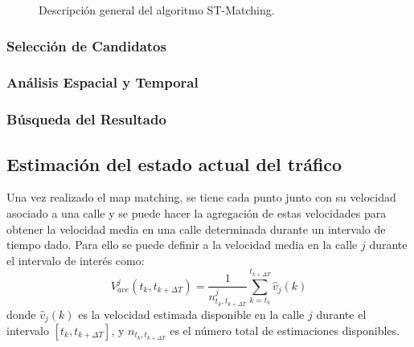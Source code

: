 \begin{figure}[h]
	\centering
	
	\caption[Descripción General de ST-Matching]{Descripción general del algoritmo ST-Matching.}
	\label{fig:st-matching} 
\end{figure}

\subsubsection{Selección de Candidatos}

\subsubsection{Análisis Espacial y Temporal}

\subsubsection{Búsqueda del Resultado}

\subsection{Estimación del estado actual del tráfico}

Una vez realizado el map matching, se tiene cada punto junto con su velocidad asociado a una calle y se puede hacer la agregación de estas velocidades para obtener la velocidad media en una calle determinada durante un intervalo de tiempo dado. Para ello se puede definir a la velocidad media en la calle $j$ durante el intervalo de interés como:
\begin{equation}
{ V }_{ ave }^{ j }({ t }_{ k },{ t }_{ k+\Delta T })=\frac { 1 }{ { n }_{ { t }_{ k },{ t }_{ k+\Delta T } }^{ j } } \sum_{ k={ t }_{ k } }^{ { t }_{ k+\Delta T } }{ \hat { { v } } _{ j }(k) }
\end{equation}
donde ${ \hat { { v } } _{ j }(k) }$ es la velocidad estimada disponible en la calle $j$ durante el intervalo $\left[ { t }_{ k },{ t }_{ k+\Delta T } \right] $, y ${ { n }_{ { t }_{ k },{ t }_{ k+\Delta T }}}$ es el número total de estimaciones disponibles.

